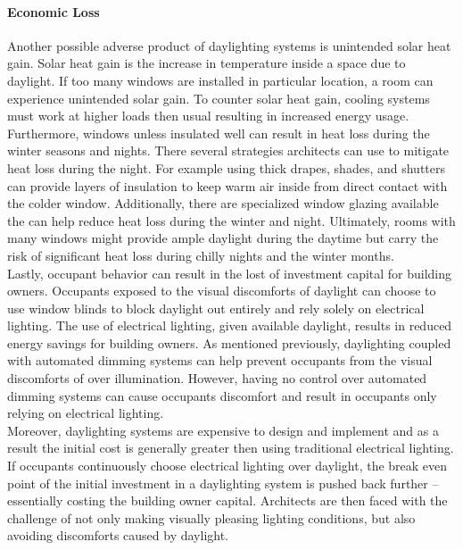 \paragraph{Economic Loss}
    
Another possible adverse product of daylighting systems is unintended solar heat gain. Solar heat gain is the increase in temperature inside a space due to daylight.  If too many windows are installed in particular location, a room can experience unintended solar gain.  To counter solar heat gain, cooling systems must work at higher loads then usual resulting in increased energy usage.  Furthermore, windows unless insulated well can result in heat loss during the winter seasons and nights.  There several strategies architects can use to mitigate heat loss during the night.  For example using thick drapes, shades, and shutters can provide layers of insulation to keep warm air inside from direct contact with the colder window.  Additionally, there are specialized window glazing available the can help reduce heat loss during the winter and night.  Ultimately, rooms with many windows might provide ample daylight during the daytime but carry the risk of significant heat loss during chilly nights and the winter months.  \\


Lastly, occupant behavior can result in the lost of investment capital for building owners.  Occupants exposed to the visual discomforts of daylight can choose to use window blinds to block daylight out entirely and rely solely on electrical lighting.  The use of electrical lighting, given available daylight, results in reduced energy savings for building owners.  As mentioned previously, daylighting coupled with automated dimming systems can help prevent occupants from the visual discomforts of over illumination.  However, having no control over automated dimming systems can cause occupants discomfort and result in occupants only relying on electrical lighting.  \\

Moreover, daylighting systems are expensive to design and implement and as a result the initial cost is generally greater then using traditional electrical lighting.  If occupants continuously choose electrical lighting over daylight, the break even point of the initial investment in a daylighting system is pushed back further -- essentially costing the building owner capital.  Architects are then faced with the challenge of not only making visually pleasing lighting conditions, but
also avoiding discomforts caused by daylight.  \\

